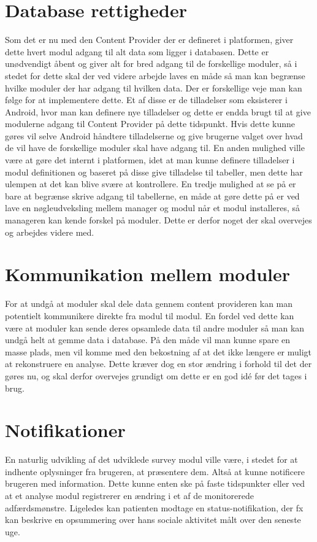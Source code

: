 \section{Database rettigheder}
Som det er nu med den Content Provider der er defineret i platformen, giver dette hvert modul adgang til alt data som ligger i databasen.
Dette er unødvendigt åbent og giver alt for bred adgang til de forskellige moduler, så i stedet for dette skal der ved videre arbejde laves en måde så man kan begrænse hvilke moduler der har adgang til hvilken data.
Der er forskellige veje man kan følge for at implementere dette.  
Et af disse er de tilladelser som eksisterer i Android, hvor man kan definere nye tilladelser og dette er endda brugt til at give modulerne adgang til Content Provider på dette tidspunkt.
Hvis dette kunne gøres vil selve Android håndtere tilladelserne og give brugerne valget over hvad de vil have de forskellige moduler skal have adgang til.
En anden mulighed ville være at gøre det internt i platformen, idet at man kunne definere tilladelser i modul definitionen og baseret på disse give tilladelse til tabeller, men dette har ulempen at det kan blive svære at kontrollere. 
En tredje mulighed at se på er bare at begrænse skrive adgang til tabellerne, en måde at gøre dette på er ved lave en nøgleudveksling mellem manager og modul når et modul installeres, så manageren kan kende forskel på moduler.
Dette er derfor noget der skal overvejes og arbejdes videre med. 

\section{Kommunikation mellem moduler}
For at undgå at moduler skal dele data gennem content provideren kan man potentielt kommunikere direkte fra modul til modul.
En fordel ved dette kan være at moduler kan sende deres opsamlede data til andre moduler så man kan undgå helt at gemme data i database.
På den måde vil man kunne spare en masse plads, men vil komme med den bekostning af at det ikke længere er muligt at rekonstruere en analyse.
Dette kræver dog en stor ændring i forhold til det der gøres nu, og skal derfor overvejes grundigt om dette er en god idé før det tages i brug.



\section{Notifikationer}
En naturlig udvikling af det udviklede survey modul ville være, i stedet for at indhente oplysninger fra brugeren, at præsentere dem.
Altså at kunne notificere brugeren med information.
Dette kunne enten ske på faste tidspunkter eller ved at et analyse modul registrerer en ændring i et af de monitorerede adfærdsmønstre.
Ligeledes kan patienten modtage en status-notifikation, der fx kan beskrive en opsummering over hans sociale aktivitet målt over den seneste uge.

